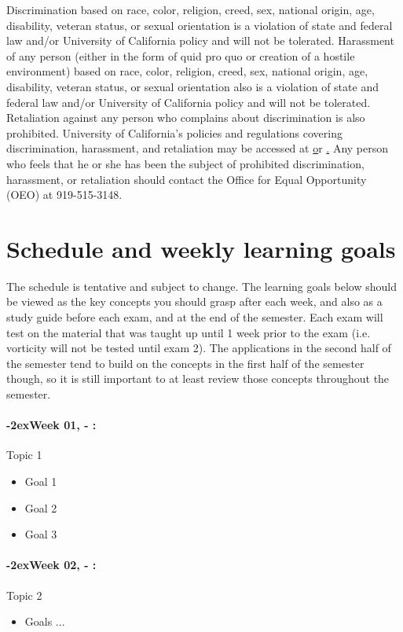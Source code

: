 \documentclass[11pt]{article}
\newcommand{\week}[1]{%
  \paragraph*{\kern-2ex\quad #1, \syldate{\today} - \AdvanceDate[4]\syldate{\today}:}%
  \ifdim\wd1=\wd\MONDAY
    \AdvanceDate[7]
  \else
    \AdvanceDate[7]
  \fi%
}
\begin{document}
\footnotesize{Discrimination based on race, color, religion, creed, sex, national origin, age, disability, veteran status, or sexual orientation is a violation of state and federal law and/or University of California policy and will not be tolerated. Harassment of any person (either in the form of quid pro quo or creation of a hostile environment) based on race, color, religion, creed, sex, national origin, age, disability, veteran status, or sexual orientation also is a violation of state and federal law and/or University of California policy and will not be tolerated. Retaliation against any person who complains about discrimination is also prohibited. University of California's policies and regulations covering discrimination, harassment, and retaliation may be accessed at \href{http://policies.ucberkeley.edu/policy/pol-04-25-05} or  \href{http://www.ucberkeley.edu/equal_op/}. Any person who feels that he or she has been the subject of prohibited discrimination, harassment, or retaliation should contact the Office for Equal Opportunity (OEO) at 919-515-3148.}


\newpage
\section*{Schedule and weekly learning goals}

The schedule is tentative and subject to change. The learning goals below should be viewed as the key concepts you should grasp after each week, and also as a study guide before each exam, and at the end of the semester. Each exam will test on the material that was taught up until 1 week prior to the exam (i.e. vorticity will not be tested until exam 2). The applications in the second half of the semester tend to build on the concepts in the first half of the semester though, so it is still important to at least review those concepts throughout the semester.

\SetDate[01/01/2018]
\week{Week 01} Topic 1
\begin{itemize}
\item Goal 1
\item Goal 2
\item Goal 3
\end{itemize}

\week{Week 02} Topic 2
\begin{itemize}
\item Goals ...
\end{itemize}
\end{document}
